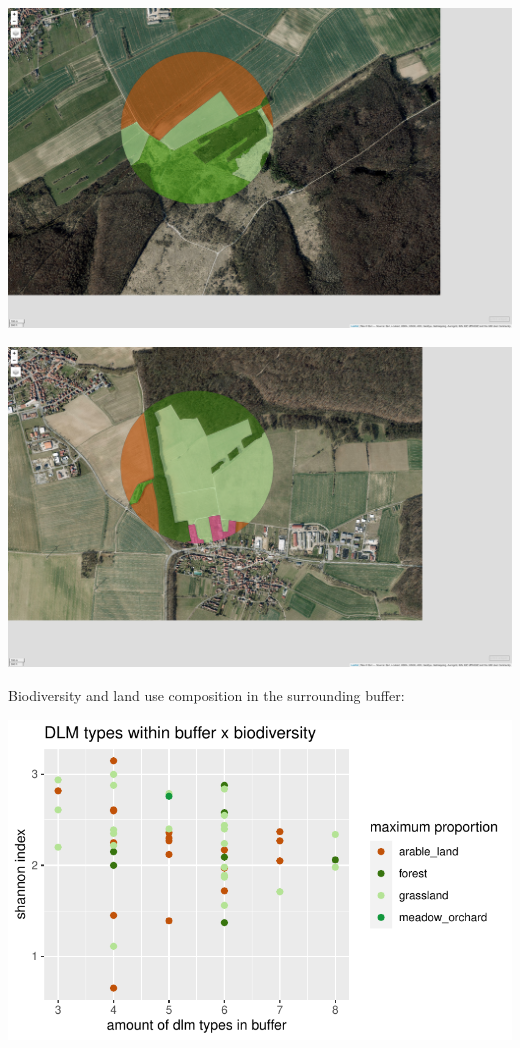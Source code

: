 \documentclass[
  letterpaper,
  DIV=11,
  numbers=noendperiod]{scrartcl}
\begin{document}
\includegraphics{Landscape_Indices_files/figure-pdf/unnamed-chunk-16-4.pdf}

\includegraphics{Landscape_Indices_files/figure-pdf/unnamed-chunk-16-5.pdf}

Biodiversity and land use composition in the surrounding buffer:

\includegraphics{Landscape_Indices_files/figure-pdf/unnamed-chunk-17-1.pdf}
\end{document}
